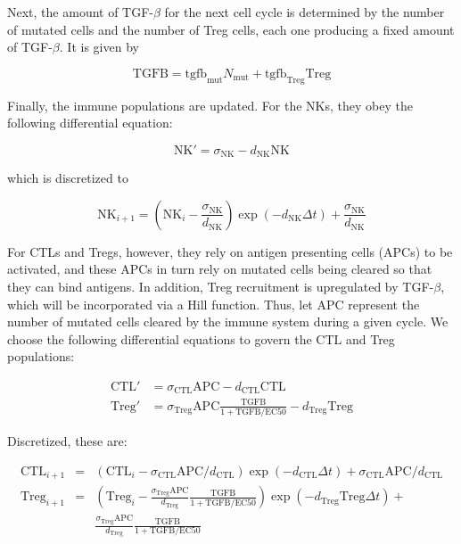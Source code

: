 \documentclass{article}
\begin{document}
Next, the amount of TGF-$\beta$ for the next cell cycle is determined by the number of mutated cells and the number of Treg cells, each one producing a fixed amount of TGF-$\beta$. It is given by

$$ \text{TGFB} = \text{tgfb}_{\text{mut}}N_{\text{mut}} + \text{tgfb}_{\text{Treg}}\text{Treg}$$

Finally, the immune populations are updated.
For the NKs, they obey the following differential equation:
 
$$ \text{NK}' = \sigma_{\text{NK}} - d_{\text{NK}}\text{NK} $$

which is discretized to

$$ \text{NK}_{i+1} = \left (\text{NK}_i-\frac{\sigma_{\text{NK}}}{d_{\text{NK}}} \right )\exp(-d_{\text{NK}}\Delta t)+\frac{\sigma_{\text{NK}}}{d_{\text{NK}}} $$

For CTLs and Tregs, however, they rely on antigen presenting cells (APCs) to be activated, and these APCs in turn rely on mutated cells being cleared so that they can bind antigens.
In addition, Treg recruitment is upregulated by TGF-$\beta$, which will be incorporated via a Hill function.
Thus, let $\text{APC}$ represent the number of mutated cells cleared by the immune system during a given cycle.
We choose the following differential equations to govern the CTL and Treg populations:

\begin{align*}
\text{CTL}' & = \sigma_{\text{CTL}}\text{APC} - d_{\text{CTL}}\text{CTL} \\
\text{Treg}' & = \sigma_{\text{Treg}}\text{APC} \frac{\text{TGFB}}{1+\text{TGFB}/\text{EC50}}- d_{\text{Treg}}\text{Treg}
\end{align*}

Discretized, these are:

\begin{align*}
\text{CTL}_{i+1} & = & \left (\text{CTL}_i-\sigma_{\text{CTL}}\text{APC}/d_{\text{CTL}}\right )\exp(- d_{\text{CTL}}\Delta t) + \sigma_{\text{CTL}}\text{APC}/d_{\text{CTL}}\\
\text{Treg}_{i+1} & = & \left (\text{Treg}_i-\frac{\sigma_{\text{Treg}}\text{APC}}{d_{\text{Treg}}} \frac{\text{TGFB}}{1+\text{TGFB}/\text{EC50}}\right )\exp(-d_{\text{Treg}}\text{Treg}\Delta t)+\\
& & \frac{\sigma_{\text{Treg}}\text{APC}}{d_{\text{Treg}}} \frac{\text{TGFB}}{1+\text{TGFB}/\text{EC50}}
\end{align*}
\end{document}
